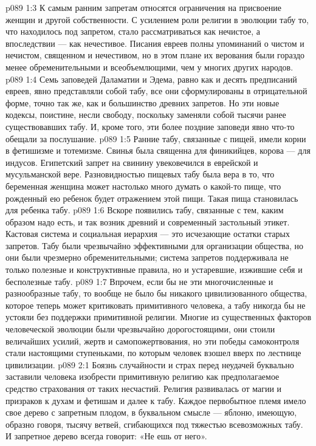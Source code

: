 \vs p089 1:3 К самым ранним запретам относятся ограничения на присвоение женщин и другой собственности. С усилением роли религии в эволюции табу то, что находилось под запретом, стало рассматриваться как нечистое, а впоследствии --- как нечестивое. Писания евреев полны упоминаний о чистом и нечистом, священном и нечестивом, но в этом плане их верования были гораздо менее обременительными и всеобъемлющими, чем у многих других народов.
\vs p089 1:4 Семь заповедей Даламатии и Эдема, равно как и десять предписаний евреев, явно представляли собой табу, все они сформулированы в отрицательной форме, точно так же, как и большинство древних запретов. Но эти новые кодексы, поистине, несли свободу, поскольку заменяли собой тысячи ранее существовавших табу. И, кроме того, эти более поздние заповеди явно что\hyp{}то обещали за послушание.
\vs p089 1:5 Ранние табу, связанные с пищей, имели корни в фетишизме и тотемизме. Свинья была священна для финикийцев, корова --- для индусов. Египетский запрет на свинину увековечился в еврейской и мусульманской вере. Разновидностью пищевых табу была вера в то, что беременная женщина может настолько много думать о какой\hyp{}то пище, что рожденный ею ребенок будет отражением этой пищи. Такая пища становилась для ребенка табу.
\vs p089 1:6 Вскоре появились табу, связанные с тем, каким образом надо есть, и так возник древний и современный застольный этикет. Кастовая система и социальная иерархия --- это исчезающие остатки старых запретов. Табу были чрезвычайно эффективными для организации общества, но они были чрезмерно обременительными; система запретов поддерживала не только полезные и конструктивные правила, но и устаревшие, изжившие себя и бесполезные табу.
\vs p089 1:7 Впрочем, если бы не эти многочисленные и разнообразные табу, то вообще не было бы никакого цивилизованного общества, которое теперь может критиковать примитивного человека, а табу никогда бы не устояли без поддержки примитивной религии. Многие из существенных факторов человеческой эволюции были чрезвычайно дорогостоящими, они стоили величайших усилий, жертв и самопожертвования, но эти победы самоконтроля стали настоящими ступеньками, по которым человек взошел вверх по лестнице цивилизации.
\vs p089 2:1 Боязнь случайности и страх перед неудачей буквально заставили человека изобрести примитивную религию как предполагаемое средство страхования от таких несчастий. Религия развивалась от магии и призраков к духам и фетишам и далее к табу. Каждое первобытное племя имело свое дерево с запретным плодом, в буквальном смысле --- яблоню, имеющую, образно говоря, тысячу ветвей, сгибающихся под тяжестью всевозможных табу. И запретное дерево всегда говорит: «Не ешь от него».
